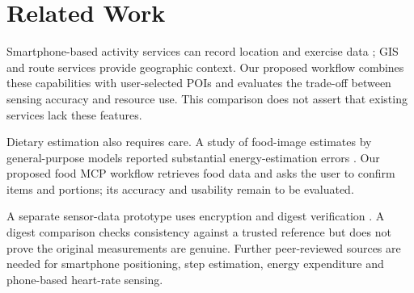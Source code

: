 \section{Related Work}\label{sec:related}
Smartphone-based activity services can record location and exercise data \cite{strava}; GIS and route services provide geographic context. Our proposed workflow combines these capabilities with user-selected POIs and evaluates the trade-off between sensing accuracy and resource use. This comparison does not assert that existing services lack these features.

Dietary estimation also requires care. A study of food-image estimates by general-purpose models reported substantial energy-estimation errors \cite{foodstudy}. Our proposed food MCP workflow retrieves food data and asks the user to confirm items and portions; its accuracy and usability remain to be evaluated.

A separate sensor-data prototype uses encryption and digest verification \cite{blockchain}. A digest comparison checks consistency against a trusted reference but does not prove the original measurements are genuine. Further peer-reviewed sources are needed for smartphone positioning, step estimation, energy expenditure and phone-based heart-rate sensing.
